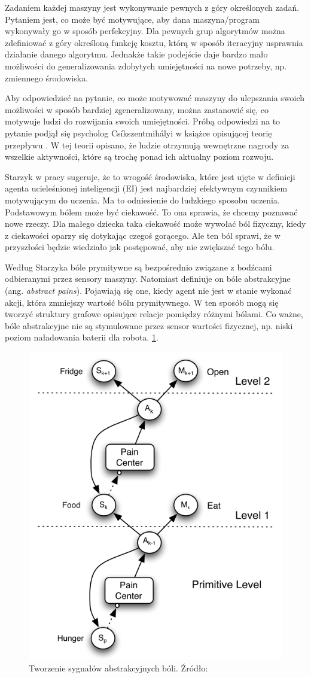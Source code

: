 Zadaniem każdej maszyny jest wykonywanie pewnych z góry określonych zadań. 
Pytaniem jest, co może być motywujące, aby dana maszyna/program wykonywały go w 
sposób perfekcyjny. Dla pewnych grup algorytmów można zdefiniować z góry 
określoną funkcję kosztu, którą w sposób iteracyjny usprawnia działanie danego 
algorytmu. Jednakże takie podejście daje bardzo mało możliwości do 
generalizowania zdobytych umiejętności na nowe potrzeby, np. zmiennego 
środowiska.

Aby odpowiedzieć na pytanie, co może motywować maszyny do ulepszania swoich 
możliwości w sposób bardziej zgeneralizowany, można zastanowić się, co motywuje 
ludzi do rozwijania swoich umiejętności. Próbą odpowiedzi na to pytanie podjął 
się psycholog Csíkszentmihályi w książce opisującej teorię przepływu 
\cite{csikszentmihalyi1996creativity}. W tej teorii opisano, że ludzie 
otrzymują wewnętrzne nagrody za wszelkie aktywności, które są trochę ponad ich 
aktualny poziom rozwoju. 

Starzyk w pracy \cite{motivation_in_ei} sugeruje, że to wrogość środowiska, 
które jest ujęte w definicji agenta ucieleśnionej inteligencji (EI) jest 
najbardziej efektywnym czynnikiem motywującym do uczenia. Ma to odniesienie do 
ludzkiego sposobu uczenia. Podstawowym bólem może być ciekawość. To ona 
sprawia, że chcemy poznawać nowe rzeczy. Dla małego dziecka taka ciekawość może 
wywołać ból fizyczny, kiedy z ciekawości oparzy się dotykając czegoś gorącego. 
Ale ten ból sprawi, że w przyszłości będzie wiedziało jak postępować, aby nie 
zwiększać tego bólu.

Według Starzyka bóle prymitywne są bezpośrednio związane z bodźcami odbieranymi 
przez sensory maszyny. Natomiast definiuje on bóle abstrakcyjne (ang. 
\textit{abstract pains}). Pojawiają się one, kiedy agent nie jest w stanie 
wykonać akcji, która zmniejszy wartość bólu prymitywnego. W ten sposób mogą się 
tworzyć struktury grafowe opisujące relacje pomiędzy różnymi bólami. Co ważne, 
bóle abstrakcyjne nie są stymulowane przez sensor wartości fizycznej, np. niski 
poziom naładowania baterii dla robota.  
\ref{fig:abstractpainscreation}.

\begin{figure}[H]
	\centering
	\includegraphics[width=0.5\linewidth]{rozdzial2/images/abstract_pains_creation}
	\caption{Tworzenie sygnałów abstrakcyjnych bóli. Źródło: 
	\cite{ml_dev_auto_systems}}
	\label{fig:abstractpainscreation}
\end{figure}

